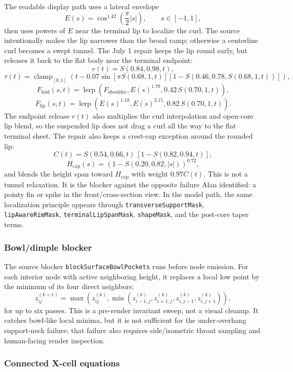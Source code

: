 \documentclass[12pt,letterpaper]{article}
\newcommand{\code}[1]{\texttt{#1}}
\begin{document}
The readable display path uses a lateral envelope
\[
  E(s)=\cos^{1.42}\left(\frac{\pi}{2}|s|\right), \qquad s\in[-1,1],
\]
then uses powers of \(E\) near the terminal lip to localize the curl. The source intentionally makes the lip narrower than the broad ramp; otherwise a centerline curl becomes a swept tunnel. The July 1 repair keeps the lip round early, but releases it back to the flat body near the terminal endpoint:
\[
  r(t)=S(0.84,0.98,t),
\]
\[
  \tau(t)=\operatorname{clamp}_{[0,1]}\left(t-0.07\sin\left[\pi S(0.68,1,t)\right]\left[1-S(0.46,0.78,S(0.68,1,t))\right]\right),
\]
\[
  F_{\mathrm{fold}}(s,t)=\operatorname{lerp}\left(F_{\mathrm{shoulder}},E(s)^{1.78},0.42\,S(0.70,1,t)\right),
\]
\[
  F_{\mathrm{lip}}(s,t)=\operatorname{lerp}\left(E(s)^{1.18},E(s)^{2.15},0.82\,S(0.70,1,t)\right).
\]
The endpoint release \(r(t)\) also multiplies the curl interpolation and open-core lip blend, so the suspended lip does not drag a curl all the way to the flat terminal sheet. The repair also keeps a crest-cap exception around the rounded lip:
\[
  C(t)=S(0.54,0.66,t)\,[1-S(0.82,0.94,t)],
\]
\[
  H_{\mathrm{cap}}(s)=\left(1-S(0.20,0.82,|s|)\right)^{0.72},
\]
and blends the height span toward \(H_{\mathrm{cap}}\) with weight \(0.97C(t)\). This is not a tunnel relaxation. It is the blocker against the opposite failure Alan identified: a pointy fin or spike in the front/cross-section view. In the model path, the same localization principle appears through \code{transverseSupportMask}, \code{lipAwareRimMask}, \code{terminalLipSpanMask}, \code{shapeMask}, and the post-core taper terms.

\subsubsection{Bowl/dimple blocker}

The source blocker \code{blockSurfaceBowlPockets} runs before node emission. For each interior node with active neighboring height, it replaces a local low point by the minimum of its four direct neighbors:
\[
  z_{ij}^{(k+1)} =
  \max\left(z_{ij}^{(k)},\min(z_{i-1,j}^{(k)},z_{i+1,j}^{(k)},z_{i,j-1}^{(k)},z_{i,j+1}^{(k)})\right),
\]
for up to six passes. This is a pre-render invariant sweep, not a visual cleanup. It catches bowl-like local minima, but it is not sufficient for the under-overhang support-neck failure; that failure also requires side/isometric throat sampling and human-facing render inspection.

\subsubsection{Connected X-cell equations}
\end{document}
